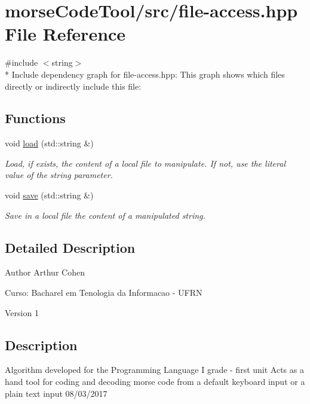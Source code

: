 \hypertarget{file-access_8hpp}{}\section{morse\+Code\+Tool/src/file-\/access.hpp File Reference}
\label{file-access_8hpp}
{\ttfamily \#include $<$string$>$}\\*
Include dependency graph for file-\/access.hpp\+:
This graph shows which files directly or indirectly include this file\+:
\subsection*{Functions}
\begin{DoxyCompactItemize}
\item 
void \hyperlink{file-access_8hpp_ae51d1a6852ebbe7d286c8d92b86b9515}{load} (std\+::string \&)
\begin{DoxyCompactList}\small\item\em Load, if exists, the content of a local file to manipulate. If not, use the literal value of the string parameter. \end{DoxyCompactList}\item 
void \hyperlink{file-access_8hpp_af991a7155a5d8381766962f4c3d7878d}{save} (std\+::string \&)
\begin{DoxyCompactList}\small\item\em Save in a local file the content of a manipulated string. \end{DoxyCompactList}\end{DoxyCompactItemize}


\subsection{Detailed Description}
\begin{DoxyAuthor}{Author}
Arthur Cohen 

Curso\+: Bacharel em Tenologia da Informacao -\/ U\+F\+RN 
\end{DoxyAuthor}
\begin{DoxyVersion}{Version}
1
\end{DoxyVersion}
\hypertarget{translator_8cpp_Description}{}\subsection{Description}\label{translator_8cpp_Description}
Algorithm developed for the Programming Language I grade -\/ first unit Acts as a hand tool for coding and decoding morse code from a default keyboard input or a plain text input 08/03/2017 

